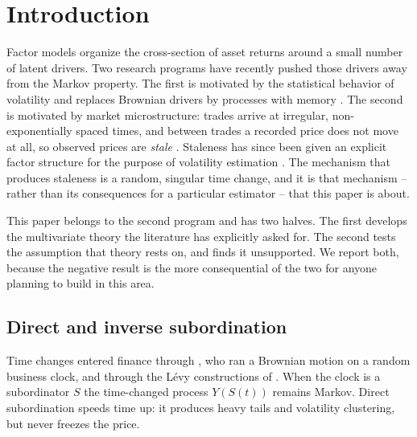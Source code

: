 \documentclass{ws-ijtaf}
\begin{document}


\section{Introduction}

Factor models organize the cross-section of asset returns around a small number
of latent drivers. Two research programs have recently pushed those drivers away
from the Markov property. The first is motivated by the statistical behavior of
volatility and replaces Brownian drivers by processes with memory
\citep{gat18}. The second is motivated by market microstructure: trades arrive
at irregular, non-exponentially spaced times, and between trades a recorded
price does not move at all, so observed prices are \emph{stale}
\citep{lo90,ban17}. Staleness has since been given an explicit factor structure
for the purpose of volatility estimation \citep{kon26}. The mechanism that
produces staleness is a random, singular time change, and it is that mechanism
-- rather than its consequences for a particular estimator -- that this paper is
about.

This paper belongs to the second program and has two halves. The first develops
the multivariate theory the literature has explicitly asked for. The second
tests the assumption that theory rests on, and finds it unsupported. We report
both, because the negative result is the more consequential of the two for
anyone planning to build in this area.

\subsection{Direct and inverse subordination}

Time changes entered finance through \citet{cla73}, who ran a Brownian motion on
a random business clock, and through the L\'evy constructions of \citet{gem01}.
When the clock is a subordinator $S$ the time-changed process $Y(S(t))$ remains
Markov. Direct subordination speeds time up: it produces heavy tails and
volatility clustering, but never freezes the price.
\end{document}
